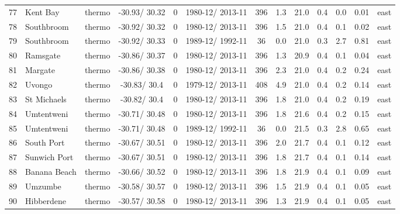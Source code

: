 \documentclass{ametsoc}
\begin{document}
\begin{table}[ht]
\begin{tabular}{cllcccccccccc}
   77 & Kent Bay & thermo & -30.93/ 30.32 &   0 & 1980-12/ 2013-11 & 396 & 1.3 & 21.0 & 0.4 & 0.0 & 0.01 & east \\
   78 & Southbroom & thermo & -30.92/ 30.32 &   0 & 1980-12/ 2013-11 & 396 & 1.5 & 21.0 & 0.4 & 0.1 & 0.02 & east \\
   79 & Southbroom & thermo & -30.92/ 30.33 &   0 & 1989-12/ 1992-11 &  36 & 0.0 & 21.0 & 0.3 & 2.7 & 0.81 & east \\
   80 & Ramsgate & thermo & -30.86/ 30.37 &   0 & 1980-12/ 2013-11 & 396 & 1.3 & 20.9 & 0.4 & 0.1 & 0.04 & east \\
   81 & Margate & thermo & -30.86/ 30.38 &   0 & 1980-12/ 2013-11 & 396 & 2.3 & 21.0 & 0.4 & 0.2 & 0.24 & east \\
   82 & Uvongo & thermo & -30.83/ 30.4 &   0 & 1979-12/ 2013-11 & 408 & 4.9 & 21.0 & 0.4 & 0.2 & 0.14 & east \\
   83 & St Michaels & thermo & -30.82/ 30.4 &   0 & 1980-12/ 2013-11 & 396 & 1.8 & 21.0 & 0.4 & 0.2 & 0.19 & east \\
   84 & Umtentweni & thermo & -30.71/ 30.48 &   0 & 1980-12/ 2013-11 & 396 & 1.8 & 21.6 & 0.4 & 0.2 & 0.15 & east \\
   85 & Umtentweni & thermo & -30.71/ 30.48 &   0 & 1989-12/ 1992-11 &  36 & 0.0 & 21.5 & 0.3 & 2.8 & 0.65 & east \\
   86 & South Port & thermo & -30.67/ 30.51 &   0 & 1980-12/ 2013-11 & 396 & 2.0 & 21.7 & 0.4 & 0.1 & 0.12 & east \\
   87 & Sunwich Port & thermo & -30.67/ 30.51 &   0 & 1980-12/ 2013-11 & 396 & 1.8 & 21.7 & 0.4 & 0.1 & 0.14 & east \\
   88 & Banana Beach & thermo & -30.66/ 30.52 &   0 & 1980-12/ 2013-11 & 396 & 1.8 & 21.9 & 0.4 & 0.1 & 0.09 & east \\
   89 & Umzumbe & thermo & -30.58/ 30.57 &   0 & 1980-12/ 2013-11 & 396 & 1.5 & 21.9 & 0.4 & 0.1 & 0.05 & east \\
   90 & Hibberdene & thermo & -30.57/ 30.58 &   0 & 1980-12/ 2013-11 & 396 & 1.3 & 21.9 & 0.4 & 0.1 & 0.05 & east \\
  \hline
  \end{tabular}
\end{table}

\newpage
\end{document}
